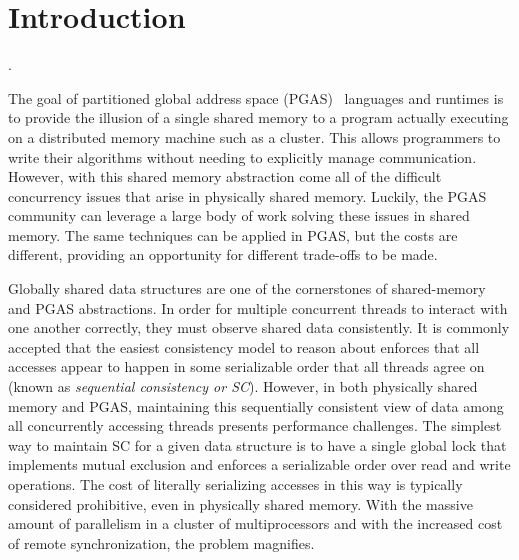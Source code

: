 \section{Introduction}
.

The goal of partitioned global address space (PGAS)~\cite{upc:2005} languages and runtimes is to provide the illusion of a single shared memory to a program actually executing on a distributed memory machine such as a cluster. This allows programmers to write their algorithms without needing to explicitly manage communication. 
However, with this shared memory abstraction come all of the difficult concurrency issues that arise in physically shared memory. Luckily, the PGAS community can leverage a large body of work solving these issues in shared memory.
The same techniques can be applied in PGAS, but the costs are different, providing an opportunity for different trade-offs to be made.

Globally shared data structures are one of the cornerstones of shared-memory and PGAS abstractions. 
In order for multiple concurrent threads to interact with one another correctly, they must observe shared data consistently. It is commonly accepted that the easiest consistency model to reason about enforces that all accesses appear to happen in some serializable order that all threads agree on (known as \emph{sequential consistency or SC}).
However, in both physically shared memory and PGAS, maintaining this sequentially consistent view of data among all concurrently accessing threads presents performance challenges.
The simplest way to maintain SC for a given data structure is to have a single global lock that implements mutual exclusion and enforces a serializable order over read and write operations. The cost of literally serializing accesses in this way is typically considered prohibitive, even in physically shared memory.
With the massive amount of parallelism in a cluster of multiprocessors and with the increased cost of remote synchronization, the problem magnifies.

